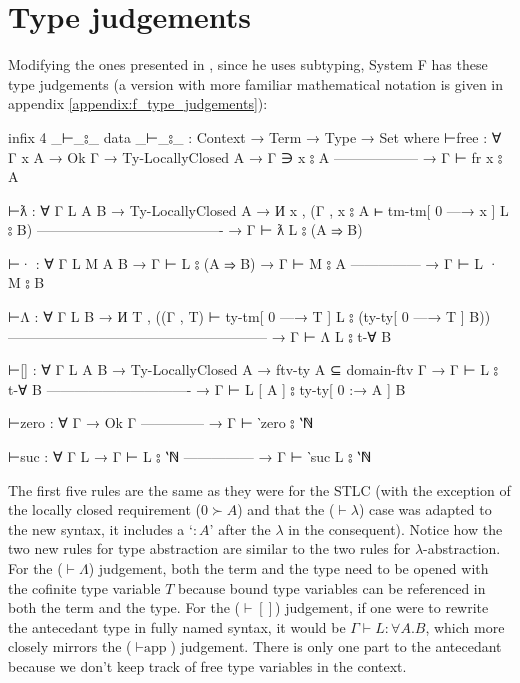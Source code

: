 \documentclass[logo,bsc,singlespacing,parskip,online]{infthesis}
\begin{document}
\section{Type judgements}
\label{chapter4:type_judgements}
Modifying the ones presented in \citet{chargueraud_locally_2012}, since he uses subtyping, System F
has these type judgements (a version with more familiar mathematical notation is given in appendix \ref{appendix:f_type_judgements}):
\begin{code}
  infix  4 _⊢_⦂_
  data _⊢_⦂_ : Context → Term → Type → Set where
    ⊢free : ∀ {Γ x A}
      → Ok Γ
      → Ty-LocallyClosed A
      → Γ ∋ x ⦂ A
        ------------------
      → Γ ⊢ fr x ⦂ A

    ⊢ƛ : ∀ {Γ L A B}
      → Ty-LocallyClosed A
      → И x , (Γ , x ⦂ A ⊢ tm-tm[ 0 —→ x ] L ⦂ B)
        ----------------------------------------
      → Γ ⊢ ƛ L ⦂ (A ⇒ B)

    ⊢· : ∀ {Γ L M A B}
      → Γ ⊢ L ⦂ (A ⇒ B)
      → Γ ⊢ M ⦂ A
        ---------------
      → Γ ⊢ L · M ⦂ B

    ⊢Λ : ∀ {Γ L B}
      → И T , ((Γ , T) ⊢ ty-tm[ 0 —→ T ] L ⦂ (ty-ty[ 0 —→ T ] B))
        --------------------------------------------------------
      → Γ ⊢ Λ L ⦂ t-∀ B

    ⊢[] : ∀ {Γ L A B}
      → Ty-LocallyClosed A
      → ftv-ty A ⊆ domain-ftv Γ
      → Γ ⊢ L ⦂ t-∀ B
        -------------------------------
      → Γ ⊢ L [ A ] ⦂ ty-ty[ 0 :→ A ] B

    ⊢zero : ∀ {Γ}
      → Ok Γ
        --------------
      → Γ ⊢ ‵zero ⦂ ‵ℕ

    ⊢suc : ∀ {Γ L}
      → Γ ⊢ L ⦂ ‵ℕ
        ---------------
      → Γ ⊢ ‵suc L ⦂ ‵ℕ
\end{code}

The first five rules are the same as they were for the STLC (with the exception of the locally
closed requirement ($0 \succ A$) and that the ($\vdash \lambda$) case was adapted to the new syntax,
it includes a `$\colon A$' after the $\lambda$ in the consequent). Notice how the two new rules for
type abstraction are similar to the two rules for $\lambda$-abstraction. For the ($\vdash\Lambda$)
judgement, both the term and the type need to be opened with the cofinite type variable $T$ because
bound type variables can be referenced in both the term and the type. For the ($\vdash[]$)
judgement, if one were to rewrite the antecedant type in fully named syntax, it would be $\Gamma
\vdash L \colon \forall A. B$, which more closely mirrors the ($\vdash\text{app}$) judgement. There
is only one part to the antecedant because we don't keep track of free type variables in the
context.
\end{document}
